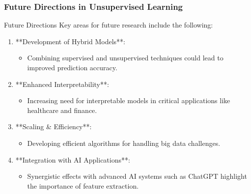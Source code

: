 \documentclass[aspectratio=169]{beamer}
\begin{document}
\begin{frame}[fragile]
  \frametitle{Future Directions in Unsupervised Learning}
  
  \begin{block}{Future Directions}
    Key areas for future research include the following:
  \end{block}
  
  \begin{enumerate}
    \item **Development of Hybrid Models**:
    \begin{itemize}
      \item Combining supervised and unsupervised techniques could lead to improved prediction accuracy.
    \end{itemize}
    
    \item **Enhanced Interpretability**:
    \begin{itemize}
      \item Increasing need for interpretable models in critical applications like healthcare and finance.
    \end{itemize}
    
    \item **Scaling \& Efficiency**:
    \begin{itemize}
      \item Developing efficient algorithms for handling big data challenges.
    \end{itemize}
    
    \item **Integration with AI Applications**:
    \begin{itemize}
      \item Synergistic effects with advanced AI systems such as ChatGPT highlight the importance of feature extraction.
    \end{itemize}
  \end{enumerate}
  
\end{frame}
\end{document}

